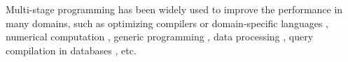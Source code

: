Multi-stage programming has been widely used to improve the performance in many
domains, such as optimizing compilers or domain-specific languages
\cite{DBLP:conf/pldi/RompfSBLCO14, DBLP:conf/snapl/RompfBLSJAOSKDK15,
DBLP:journals/tecs/SujeethBLRCOO14, DBLP:conf/gpce/SujeethGBLROO13,
DBLP:journals/jfp/CaretteKS09}, numerical computation \cite{PGL-038,
DBLP:conf/pepm/AktemurKKS13}, generic programming
\cite{DBLP:journals/pacmpl/Yallop17, Ofenbeck:2017:SGP:3136040.3136060}, data
processing \cite{DBLP:conf/oopsla/JonnalageddaCSRO14,
DBLP:conf/popl/KiselyovBPS17}, query compilation in databases
\cite{DBLP:conf/osdi/EssertelTDBOR18, DBLP:conf/sigmod/TahboubER18}, etc.
